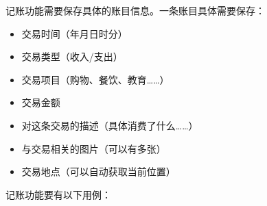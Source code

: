 \documentclass{article}
\begin{document}
\noindent{}记账功能需要保存具体的账目信息。一条账目具体需要保存：%

\begin{itemize}[noitemsep,topsep=\mdcompacttopsep]%

\item{}交易时间（年月日时分）%

\item{}交易类型（收入/支出）%

\item{}交易项目（购物、餐饮、教育……）%

\item{}交易金额%

\item{}对这条交易的描述（具体消费了什么……）%

\item{}与交易相关的图片（可以有多张）%

\item{}交易地点（可以自动获取当前位置）%
\end{itemize}%

\noindent{}记账功能要有以下用例：%
\end{document}
